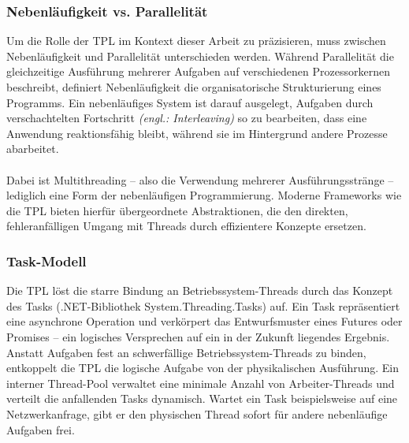 \subsubsection*{Nebenläufigkeit vs. Parallelität}
Um die Rolle der TPL im Kontext dieser Arbeit zu präzisieren, muss zwischen Nebenläufigkeit und Parallelität unterschieden werden. Während Parallelität die gleichzeitige Ausführung mehrerer Aufgaben auf verschiedenen Prozessorkernen beschreibt, definiert Nebenläufigkeit die organisatorische Strukturierung eines Programms. Ein nebenläufiges System ist darauf ausgelegt, Aufgaben durch verschachtelten Fortschritt \textit{(engl.: Interleaving)} so zu bearbeiten, dass eine Anwendung reaktionsfähig bleibt, während sie im Hintergrund andere Prozesse abarbeitet.\\
\\Dabei ist Multithreading – also die Verwendung mehrerer Ausführungsstränge – lediglich eine Form der nebenläufigen Programmierung. Moderne Frameworks wie die TPL bieten hierfür übergeordnete Abstraktionen, die den direkten, fehleranfälligen Umgang mit Threads durch effizientere Konzepte ersetzen.
\subsubsection*{Task-Modell}
Die TPL löst die starre Bindung an Betriebssystem-Threads durch das Konzept des Tasks (.NET-Bibliothek System.Threading.Tasks) auf. Ein Task repräsentiert eine asynchrone Operation und verkörpert das Entwurfsmuster eines Futures oder Promises – ein logisches Versprechen auf ein in der Zukunft liegendes Ergebnis. Anstatt Aufgaben fest an schwerfällige Betriebssystem-Threads zu binden, entkoppelt die TPL die logische Aufgabe von der physikalischen Ausführung. Ein interner Thread-Pool verwaltet eine minimale Anzahl von Arbeiter-Threads und verteilt die anfallenden Tasks dynamisch. Wartet ein Task beispielsweise auf eine Netzwerkanfrage, gibt er den physischen Thread sofort für andere nebenläufige Aufgaben frei.

